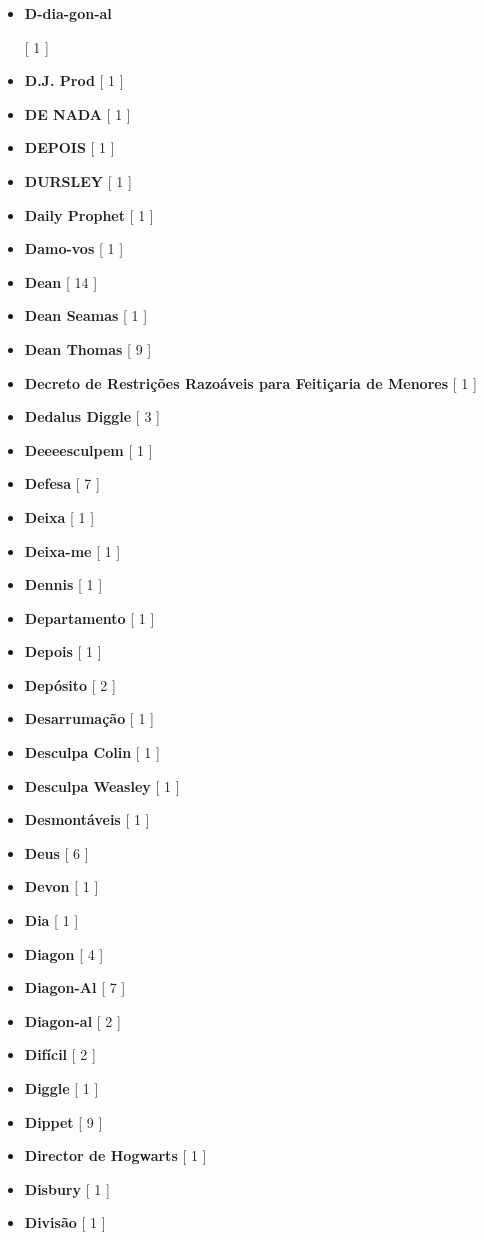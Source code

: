 \documentclass[a4paper]{article}
\begin{document}
{\begin{itemize}
	\item \hypertarget{D}{\textbf{D-dia-gon-al}} [ 1 ]
	\item \textbf{D.J. Prod} [ 1 ]
	\item \textbf{DE NADA} [ 1 ]
	\item \textbf{DEPOIS} [ 1 ]
	\item \textbf{DURSLEY} [ 1 ]
	\item \textbf{Daily Prophet} [ 1 ]
	\item \textbf{Damo-vos} [ 1 ]
	\item \textbf{Dean} [ 14 ]
	\item \textbf{Dean Seamas} [ 1 ]
	\item \textbf{Dean Thomas} [ 9 ]
	\item \textbf{Decreto de Restrições Razoáveis para Feitiçaria de Menores} [ 1 ]
	\item \textbf{Dedalus Diggle} [ 3 ]
	\item \textbf{Deeeesculpem} [ 1 ]
	\item \textbf{Defesa} [ 7 ]
	\item \textbf{Deixa} [ 1 ]
	\item \textbf{Deixa-me} [ 1 ]
	\item \textbf{Dennis} [ 1 ]
	\item \textbf{Departamento} [ 1 ]
	\item \textbf{Depois} [ 1 ]
	\item \textbf{Depósito} [ 2 ]
	\item \textbf{Desarrumação} [ 1 ]
	\item \textbf{Desculpa Colin} [ 1 ]
	\item \textbf{Desculpa Weasley} [ 1 ]
	\item \textbf{Desmontáveis} [ 1 ]
	\item \textbf{Deus} [ 6 ]
	\item \textbf{Devon} [ 1 ]
	\item \textbf{Dia} [ 1 ]
	\item \textbf{Diagon} [ 4 ]
	\item \textbf{Diagon-Al} [ 7 ]
	\item \textbf{Diagon-al} [ 2 ]
	\item \textbf{Difícil} [ 2 ]
	\item \textbf{Diggle} [ 1 ]
	\item \textbf{Dippet} [ 9 ]
	\item \textbf{Director de Hogwarts} [ 1 ]
	\item \textbf{Disbury} [ 1 ]
	\item \textbf{Divisão} [ 1 ]

\end{itemize}}
\end{document}
